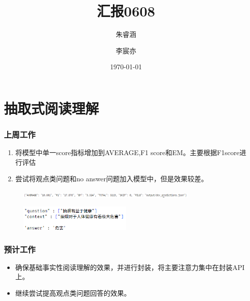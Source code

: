 \documentclass{beamer}
\title{汇报0608}
\institute{项目三}
\author{朱睿涵 \and 李宸亦}
\date{\today}
\begin{document}
\frame{\titlepage} %



\section{抽取式阅读理解}

\begin{frame}
    \frametitle{上周工作}

    \begin{enumerate}
        \item 将模型中单一score指标增加到AVERAGE,F1 score和EM。主要根据F1score进行评估
        \item 尝试将观点类问题和no answer问题加入模型中，但是效果较差。
    \end{enumerate}

    \begin{figure}
        \centering
        \includegraphics[width=0.8\textwidth]{fig/pic1.png}
    \end{figure}

    \begin{figure}
        \centering
        \includegraphics[width=0.5\textwidth]{fig/pic.png}
    \end{figure}


\end{frame}



\begin{frame}
    \frametitle{预计工作}

    \begin{itemize}
        \item 确保基础事实性阅读理解的效果，并进行封装，将主要注意力集中在封装API上。
        \item 继续尝试提高观点类问题回答的效果。
    \end{itemize}

\end{frame}
\end{document}
